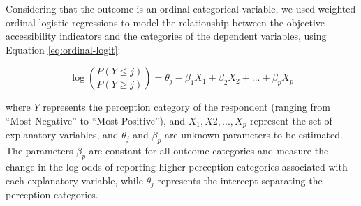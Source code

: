\documentclass[preprint, 3p,
authoryear]{elsarticle} %
\begin{document}
Considering that the outcome is an ordinal categorical variable, we used
weighted ordinal logistic regressions \citep{lumley2011} to model the
relationship between the objective accessibility indicators and the
categories of the dependent variables, using Equation
\ref{eq:ordinal-logit}:

\begin{equation}
\label{eq:ordinal-logit}
\log(\frac{P(Y\le j)}{P(Y\ge j)}) = \theta_j - \beta_1 X_1 + \beta_2 X_2 + ... + \beta_p X_p
\end{equation}

\noindent where \(Y\) represents the perception category of the
respondent (ranging from ``Most Negative'' to ``Most Positive''), and
\(X_1, X2, ..., X_p\) represent the set of explanatory variables, and
\(\theta_j\) and \(\beta_p\) are unknown parameters to be estimated. The
parameters \(\beta_p\) are constant for all outcome categories and
measure the change in the log-odds of reporting higher perception
categories associated with each explanatory variable, while \(\theta_j\)
represents the intercept separating the perception categories.
\end{document}
